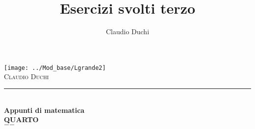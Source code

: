 \documentclass[openany]{book}%
\title{Esercizi svolti terzo}
\author{Claudio Duchi}
\date{\datetime}
\makeatletter
\newlength{\gnam}
\newcommand{\HRule}{\rule{\linewidth}{0.5mm}}
\renewcommand\frontmatter{%
	\cleardoublepage
	\@mainmatterfalse
}
\renewcommand\mainmatter{%
	\cleardoublepage
	\@mainmattertrue
}
\makeatother
\begin{document}
\frontmatter
\begin{titlepage}
	
	\begin{center}
		
		
			
		\texttt{[image: ../Mod\_base/Lgrande2]}\\[1cm]    
		\textsc{\LARGE Claudio Duchi}\\[1.5cm]
		
		
		
		\HRule \\[0.4cm]
		{ \huge \bfseries Appunti di matematica}\\[0.4cm]
		{\bfseries QUARTO}\\[0.4cm]
		\vfill
		{\large $-$\DTMnow$-$}
		\end{center}
	\end{titlepage}
\setcounter{page}{2}

\tableofcontents 
\cleardoublepage
\listoftables
{}
\cleardoublepage
\listoffigures
{}
\cleardoublepage\renewcommand{}
\lstlistoflistings{}
 \listoftodos
\mainmatter%

{}

\printindex
\end{document}
